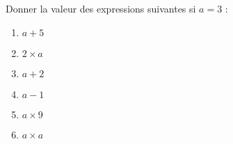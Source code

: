 
\begin{exercice}\label{exosmath-0935}

    Donner la valeur des expressions suivantes si \( a=3\) :
    \begin{multicols}{3}
        \begin{enumerate}
            \item
                \( a+5\)
            \item
                \( 2\times a\)
            \item
                \( a+2\)
            \item
                \( a-1\)
            \item
                \( a\times 9\)
            \item
                \( a\times a\)
        \end{enumerate}
    \end{multicols}

\end{exercice}
